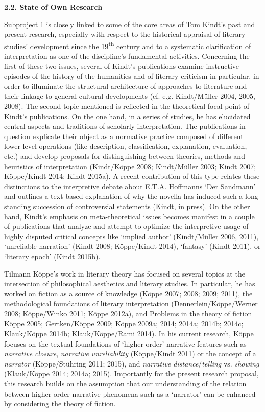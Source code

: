 
\vspace{.2cm}
\noindent\textbf{\large 2.2. State of Own Research}
\vspace{.2cm}

Subproject 1 is closely linked to some of the core areas of Tom Kindt's past and present research, especially with respect to the historical appraisal of literary studies' development since the 19\textsuperscript{th} century and to a systematic clarification of interpretation as one of the discipline's fundamental activities. Concerning the first of these two issues, several of Kindt's publications examine instructive episodes of the history of the humanities and of literary criticism in particular, in order to illuminate the structural architecture of approaches to literature and their linkage to general cultural developments (cf. e.g. Kindt/M\"uller 2004, 2005, 2008). The second topic mentioned is reflected in the theoretical focal point of Kindt's publications. On the one hand, in a series of studies, he has elucidated central aspects and traditions of scholarly interpretation. The publications in question explicate their object as a normative practice composed of different lower level operations (like description, classification, explanation, evaluation, etc.) and develop proposals for distinguishing between theories, methods and heuristics of interpretation (Kindt/K\"oppe 2008; Kindt/M\"uller 2003; Kindt 2007; K\"oppe/Kindt 2014; Kindt 2015a). A recent contribution of this type relates these distinctions to the interpretive debate about E.T.A. Hoffmanns `Der Sandmann' and outlines a text-based explanation of why the novella has induced such a long-standing succession of controversial statements (Kindt, in press). On the other hand, Kindt's emphasis on meta-theoretical issues becomes manifest in a couple of publications that analyze and attempt to optimize the interpretive usage of highly disputed critical concepts like `implied author' (Kindt/M\"uller 2006, 2011), `unreliable narration' (Kindt 2008; K\"oppe/Kindt 2014), `fantasy' (Kindt 2011), or `literary epoch' (Kindt 2015b).


\vspace{.2cm}
\noindent Tilmann K\"oppe's work in literary theory has focused on several topics at the intersection of philosophical aesthetics and literary studies. In particular, he has worked on fiction as a source of knowledge (K\"oppe 2007; 2008; 2009; 2011), the methodological foundations of literary interpretation (Dennerlein/K\"oppe/Werner 2008; K\"oppe/Winko 2011; K\"oppe 2012a), and Problems in the theory of fiction K\"oppe 2005; Gertken/K\"oppe 2009; K\"oppe 2009a; 2014; 2014a; 2014b; 2014c; Klauk/K\"oppe 2014b; Klauk/K\"oppe/Rami 2014). In his current research, K\"oppe focuses on the textual foundations of `higher-order' narrative features such as \emph{narrative closure}, \emph{narrative unreliability} (K\"oppe/Kindt 2011) or the concept of a \emph{narrator} (K\"oppe/St\"uhring 2011; 2015), and \emph{narrative distance}/\emph{telling} vs. \emph{showing} (Klauk/K\"oppe 2014; 2014a; 2015). Importantly for the present research proposal, this research builds on the assumption that our understanding of the relation between higher-order narrative phenomena such as a `narrator' can be enhanced by considering the theory of fiction.

